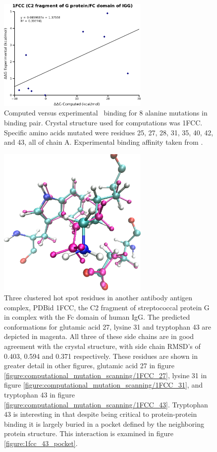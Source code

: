 \begin{figure}[h]
    \centering
  \includegraphics[width=0.65\textwidth]{figures/1fcc.png}
  \caption{
Computed versus experimental \ddg\ binding for 8 alanine mutations in  binding pair.
Crystal structure used for computations was 1FCC.
Specific amino acids mutated were residues 25, 27, 28, 31, 35, 40, 42, and 43, all of chain A.
Experimental binding affinity taken from \protect\cite{thorn2001asedb}.
          }
\end{figure}

\begin{figure}[h]
  \centering
  \includegraphics[width=0.65\textwidth,height=0.3\textheight,keepaspectratio]{figures/mutation_side_chain_images/1fcc_27_31_43.png}
  \caption{Three clustered hot spot residues in another antibody antigen complex, PDBid 1FCC, the C2 fragment of streptococcal protein G in complex with the Fc domain of human IgG.
The predicted conformations for glutamic acid 27, lysine 31 and tryptophan 43 are depicted in magenta.
All three of these side chains are in good agreement with the crystal structure, with side chain RMSD's of 0.403, 0.594 and 0.371 respectively.
These residues are shown in greater detail in other figures, glutamic acid 27 in figure \protect\ref{figure:computational_mutation_scanning/1FCC_27}, lysine 31 in figure \protect\ref{figure:computational_mutation_scanning/1FCC_31}, and tryptophan 43 in figure \protect\ref{figure:computational_mutation_scanning/1FCC_43}.
Tryptophan 43 is interesting in that despite being critical to protein-protein binding it is largely buried in a pocket defined by the neighboring protein structure.
This interaction is examined in figure \protect\ref{figure:1fcc_43_pocket}.}
  \label{figure:computational_mutation_scanning/1FCC_27_31_43}
\end{figure}

